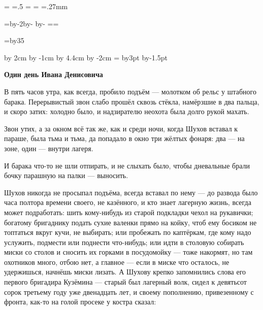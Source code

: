\pdfpagewidth=297mm
\pdfpageheight=210mm
\pdfhorigin=1in
\pdfvorigin=0pt

\shhtotal=\pdfpagewidth
\htotal=.5\shhtotal
\vtotal=\pdfpageheight
\shoutline=0pt
\shstaplewidth=0pt
\shcrop=0pt
\shfootline={}
\shthickness=.27mm

\horigin=9mm
\hoffset=9mm
\hsize=\htotal \advance\hsize by-2\horigin \advance\hsize by-\hoffset
\advance\hsize by-\QUIRE
\output={\ifodd\pageno\else\hoffset=\QUIRE\fi \plainoutput}

\vorigin=15mm
\vsize=\topskip \advance\vsize by35\baselineskip

\raggedbottom
\advance\hsize by 2cm
\advance\pdfhorigin by -1cm
\advance\vsize by 4.4cm
\advance\pdfvorigin by -2cm
\footline={\hfil{}}
 
\advance\hsize by3pt
\advance\pdfhorigin by-1.5pt

\centerline{\bf Один день Ивана Денисовича}

\bigskip

В пять часов утра, как всегда, пробило подъём --- молотком об рельс у штабного барака. 
Перерывистый звон слабо прошёл сквозь стёкла, намёрзшие в два пальца, и скоро затих: холодно 
было, и надзирателю неохота была долго рукой махать.

Звон утих, а за окном всё так же, как и среди ночи, когда Шухов вставал к параше, была тьма и 
тьма, да попадало в окно три жёлтых фонаря: два --- на зоне, один --- внутри лагеря.

И барака что-то не шли отпирать, и не слыхать было, чтобы дневальные брали бочку парашную на 
палки --- выносить.

Шухов никогда не просыпал подъёма, всегда вставал по нему --- до развода было часа полтора 
времени своего, не казённого, и кто знает лагерную жизнь, всегда может подработать: шить 
кому-нибудь из старой подкладки чехол на рукавички; богатому бригаднику подать сухие 
валенки прямо на койку, чтоб ему босиком не топтаться вкруг кучи, не выбирать; или пробежать 
по каптёркам, где кому надо услужить, подмести или поднести что-нибудь; или идти в столовую 
собирать миски со столов и сносить их горками в посудомойку --- тоже накормят, но там 
охотников много, отбою нет, а главное --- если в миске что осталось, не удержишься, начнёшь 
миски лизать. А Шухову крепко запомнились слова его первого бригадира Кузёмина --- старый был 
лагерный волк, сидел к девятьсот сорок третьему году уже двенадцать лет, и своему 
пополнению, привезенному с фронта, как-то на голой просеке у костра сказал:

